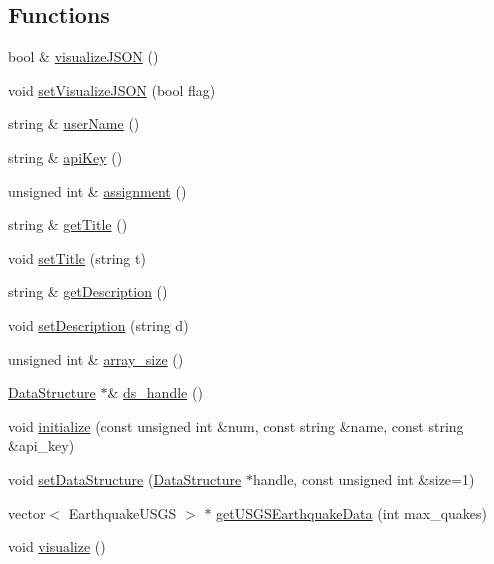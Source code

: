 \subsection*{Functions}
\begin{DoxyCompactItemize}
\item 
bool \& \hyperlink{namespacebridges_1_1_bridges_a692124feb006d58c277db36c2e9342c8}{visualize\+J\+S\+O\+N} ()
\item 
void \hyperlink{namespacebridges_1_1_bridges_a322d97571beb1aa2b7d5e335990d9fa4}{set\+Visualize\+J\+S\+O\+N} (bool flag)
\item 
string \& \hyperlink{namespacebridges_1_1_bridges_a98c0c6658b8eb9e8f20a7f3119cbd984}{user\+Name} ()
\item 
string \& \hyperlink{namespacebridges_1_1_bridges_a4ec319d8c731624bd1aa0efa2427044e}{api\+Key} ()
\item 
unsigned int \& \hyperlink{namespacebridges_1_1_bridges_a97d6cfdc40ecead5d802ac2054933038}{assignment} ()
\item 
string \& \hyperlink{namespacebridges_1_1_bridges_acc332b802bfcede5a9ce257037b57043}{get\+Title} ()
\item 
void \hyperlink{namespacebridges_1_1_bridges_af36e132d582dabf5ae5ee8b8f26976db}{set\+Title} (string t)
\item 
string \& \hyperlink{namespacebridges_1_1_bridges_ac1475b5f38d5d8ad435df8f865f2d55b}{get\+Description} ()
\item 
void \hyperlink{namespacebridges_1_1_bridges_a7260f3ef2633a1f6e3f8c19c18d87013}{set\+Description} (string d)
\item 
unsigned int \& \hyperlink{namespacebridges_1_1_bridges_ae3a860599a21cd9bfe0935106ae90a71}{array\+\_\+size} ()
\item 
\hyperlink{classbridges_1_1_data_structure}{Data\+Structure} $\ast$\& \hyperlink{namespacebridges_1_1_bridges_a611a331ed42dfdf89a724e435fbe37af}{ds\+\_\+handle} ()
\item 
void \hyperlink{namespacebridges_1_1_bridges_aff8e9d79f9e75cf20b51607ec385f189}{initialize} (const unsigned int \&num, const string \&name, const string \&api\+\_\+key)
\item 
void \hyperlink{namespacebridges_1_1_bridges_a4335a2dcc29c9288cf6482182d8f9bf6}{set\+Data\+Structure} (\hyperlink{classbridges_1_1_data_structure}{Data\+Structure} $\ast$handle, const unsigned int \&size=1)
\item 
vector$<$ Earthquake\+U\+S\+G\+S $>$ $\ast$ \hyperlink{namespacebridges_1_1_bridges_a0c4fb401192a6fa3048cf78e783958e8}{get\+U\+S\+G\+S\+Earthquake\+Data} (int max\+\_\+quakes)
\item 
void \hyperlink{namespacebridges_1_1_bridges_a2806e395134614cdd6327400b53d28ad}{visualize} ()
\end{DoxyCompactItemize}


